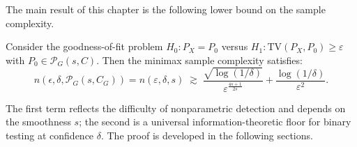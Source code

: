 The main result of this chapter is the following lower bound on the sample complexity.

\begin{theorem}
\label{catcomplexitythm}
Consider the goodness-of-fit problem $H_0 : P_X = P_0$ versus $H_1 : \mathrm{TV}(P_X,P_0)
\geq \varepsilon$ with $P_0 \in \mathcal{P}_G(s, C)$. Then the minimax sample complexity satisfies:
\[
    n(\epsilon,\delta,\mathcal{P}_G(s,C_G))= n(\varepsilon, \delta, s)
    \;\gtrsim\;
    \frac{\sqrt{\log(1/\delta)}}{\varepsilon^{\frac{4s+1}{2s}}}
    + \frac{\log(1/\delta)}{\varepsilon^{2}}.
\]
\end{theorem}

The first term reflects the difficulty of nonparametric detection and depends on the smoothness $s$;
the second is a universal information-theoretic floor for binary testing at confidence $\delta$.
The proof is developed in the following sections.

